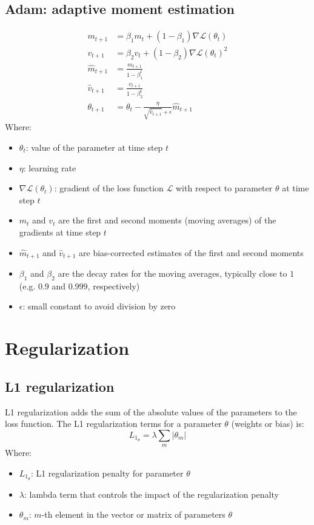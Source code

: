 \documentclass[a4paper]{report}
\newcommand{\abs}[1]{\lvert#1\rvert}
\newcommand{\ELL}{\mathcal{L}}
\begin{document}
\subsection{Adam: adaptive moment estimation}
\begin{align*}
    m_{t+1} &= \beta_1 m_t + (1-\beta_1) \nabla\ELL(\theta_t) \\
    v_{t+1} &= \beta_2 v_t + (1-\beta_2) \nabla\ELL(\theta_t)^2\\
    \hat{m}_{t+1} &= \frac{m_{t+1}}{1-\beta_1^t}\\
    \hat{v}_{t+1} &= \frac{v_{t+1}}{1-\beta_2^t}\\
    \theta_{t+1} &= \theta_t - \frac{\eta}{\sqrt{\hat{v}_{t+1}}+\epsilon} \hat{m}_{t+1}
\end{align*}
Where:
\begin{itemize}
    \item $\theta_t$: value of the parameter at time step $t$
    \item $\eta$: learning rate
    \item $\nabla\ELL(\theta_t)$: gradient of the loss function $\ELL$ with respect to parameter $\theta$ at time step $t$
    \item $m_t$ and $v_t$ are the first and second moments (moving averages) of the gradients at time step $t$
    \item $\hat{m}_{t+1}$ and $\hat{v}_{t+1}$ are bias-corrected estimates of the first and second moments
    \item $\beta_1$ and $\beta_2$ are the decay rates for the moving averages, typically close to $1$ (e.g. $0.9$ and $0.999$, respectively)
    \item $\epsilon$: small constant to avoid division by zero
\end{itemize}

\section{Regularization}

\subsection{L1 regularization}
L1 regularization adds the sum of the absolute values of the parameters to the loss function. The L1 regularization terms for a parameter $\theta$ (weights or bias) is:
\begin{equation*}
    L_{1_\theta} = \lambda \sum_m \abs{\theta_m}
\end{equation*}
Where:
\begin{itemize}
    \item $L_{1_\theta}$: L1 regularization penalty for parameter $\theta$
    \item $\lambda$: lambda term that controls the impact of the regularization penalty
    \item $\theta_m$: $m$-th element in the vector or matrix of parameters $\theta$
\end{itemize}
\end{document}
